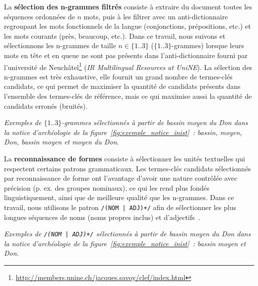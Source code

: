     La \textbf{sélection des n-grammes filtrés} consiste à extraire du document
    toutes les séquences ordonnées de $n$ mots, puis à les filtrer avec un
    anti-dictionnaire regroupant les mots fonctionnels de la langue
    (conjonctions, prépositions, etc.) et les mots courants (\og{}près\fg{},
    \og{}beaucoup\fg{}, etc.). Dans ce travail, nous suivons
     et sélectionnons les n-grammes de taille $n \in
    \{1..3\}$ ($\{1..3\}$-grammes) lorsque leurs mots en tête et en queue ne
    sont pas présents dans l'anti-dictionnaire fourni par l'université de
    Neuchâtel\footnote{\url{http://members.unine.ch/jacques.savoy/clef/index.html}}
    (\textit{IR Multilingual Resources at UniNE}). La sélection des n-grammes
    est très exhaustive, elle fournit un grand nombre de termes-clés candidats,
    ce qui permet de maximiser la quantité de candidats présents dans l'ensemble
    des termes-clés de référence, mais ce qui maximise aussi la quantité de
    candidats erronés (bruités).
    
    \textit{Exemples de $\{1..3\}$-grammes sélectionnés à partir de \og{}bassin
    moyen du Don\fg{} dans la notice d'archéologie de la
    figure~\ref{fig:exemple_notice_inist}~: \og{}bassin\fg{}, \og{}moyen\fg{},
    \og{}Don\fg{}, \og{}bassin moyen\fg{} et \og{}moyen du Don\fg{}}.

    La \textbf{reconnaissance de formes} consiste à sélectionner les unités
    textuelles qui respectent certains patrons grammaticaux. Les termes-clés
    candidats sélectionnés par reconnaissance de forme ont l'avantage d'avoir
    une nature contrôlée avec précision (p. ex. des groupes nominaux), ce qui
    les rend plus fondés linguistiquement, ainsi que de meilleure qualité que
    les n-grammes. Dans ce travail, nous utilisons le patron
    \texttt{/(NOM | ADJ)+/} afin de sélectionner les plus longues séquences de
    noms (noms propres inclus) et d'adjectifs~\cite{hassan2010conundrums}.
    
    \textit{Exemples de \texttt{/(NOM | ADJ)+/} sélectionnés à partir de
    \og{}bassin moyen du Don\fg{} dans la notice d'archéologie de la
    figure~\ref{fig:exemple_notice_inist}~: \og{}bassin moyen\fg{} et
    \og{}Don\fg{}.}

